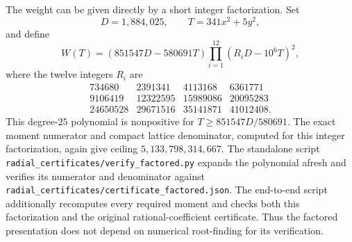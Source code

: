 The weight can be given directly by a short integer factorization.  Set
\[
 D=1{,}884{,}025,\qquad T=341x^2+5y^2,
\]
and define
\[
 W(T)=(851547D-580691T)
       \prod_{i=1}^{12}(R_iD-10^6T)^2,
\]
where the twelve integers $R_i$ are
\[
\begin{array}{rrrr}
734680&2391341&4113168&6361771\\
9106419&12322595&15989086&20095283\\
24650528&29671516&35141871&41012408.
\end{array}
\]
This degree-$25$ polynomial is nonpositive for
$T\ge851547D/580691$.  The exact moment numerator and compact lattice
denominator, computed for this integer factorization, again give ceiling
$5{,}133{,}798{,}314{,}667$.
The standalone script \texttt{radial\_certificates/verify\_factored.py}
expands the polynomial afresh and verifies its numerator and denominator
against \texttt{radial\_certificates/certificate\_factored.json}.
The end-to-end script additionally recomputes every required moment and
checks both this factorization and the original rational-coefficient
certificate.  Thus the factored presentation does not depend on numerical
root-finding for its verification.
